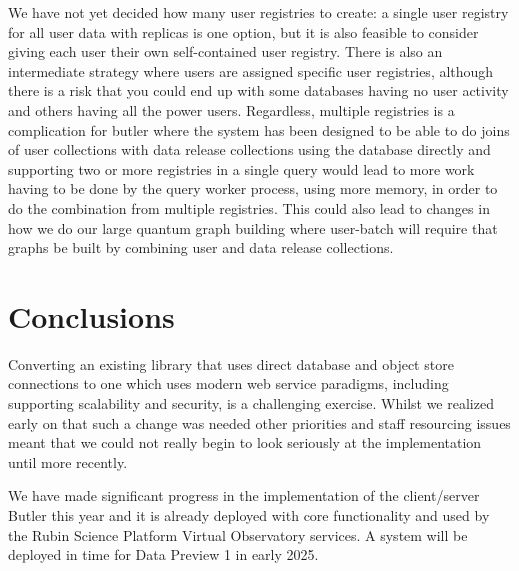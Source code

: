 We have not yet decided how many user registries to create: a single user registry for all user data with replicas is one option, but it is also feasible to consider giving each user their own self-contained user registry.
There is also an intermediate strategy where users are assigned specific user registries, although there is a risk that you could end up with some databases having no user activity and others having all the power users.
Regardless, multiple registries is a complication for butler where the system has been designed to be able to do joins of user collections with data release collections using the database directly and supporting two or more registries in a single query would lead to more work having to be done by the query worker process, using more memory, in order to do the combination from multiple registries.
This could also lead to changes in how we do our large quantum graph building where user-batch will require that graphs be built by combining user and data release collections.

\section{Conclusions}

Converting an existing library that uses direct database and object store connections to one which uses modern web service paradigms, including supporting scalability and security, is a challenging exercise.
Whilst we realized early on that such a change was needed \cite{DMTN-169,DMTN-176} other priorities and staff resourcing issues meant that we could not really begin to look seriously at the implementation until more recently. \cite{DMTN-282,DMTN-283}

We have made significant progress in the implementation of the client/server Butler this year and it is already deployed with core functionality and used by the Rubin Science Platform Virtual Observatory services. \cite{DMTN-208}
A system will be deployed in time for Data Preview 1 in early 2025. \cite{RTN-011}
